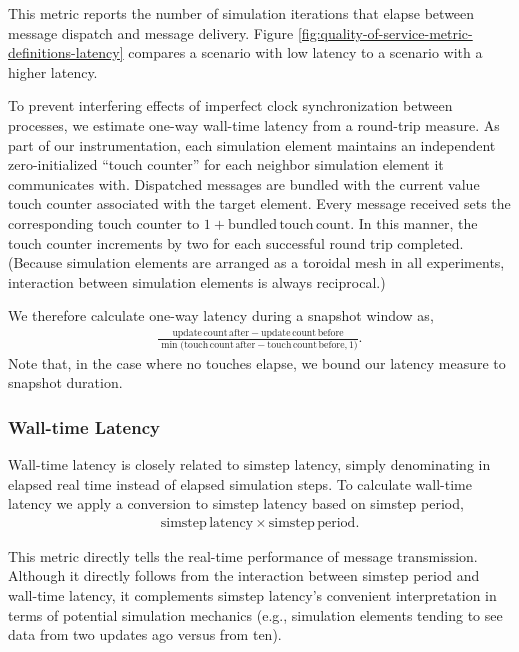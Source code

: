 This metric reports the number of simulation iterations that elapse between message dispatch and message delivery.
Figure \ref{fig:quality-of-service-metric-definitions-latency} compares a scenario with low latency to a scenario with a higher latency.

To prevent interfering effects of imperfect clock synchronization between processes, we estimate one-way wall-time latency from a round-trip measure.
As part of our instrumentation, each simulation element maintains an independent zero-initialized ``touch counter'' for each neighbor simulation element it communicates with.
Dispatched messages are bundled with the current value touch counter associated with the target element.
Every message received sets the corresponding touch counter to $1 + \mathrm{bundled\,touch\,count}$.
In this manner, the touch counter increments by two for each successful round trip completed.
(Because simulation elements are arranged as a toroidal mesh in all experiments, interaction between simulation elements is always reciprocal.)

We therefore calculate one-way latency during a snapshot window as,
\begin{align*}
  \frac{
    \mathrm{update\,count\,after} - \mathrm{update\,count\,before}
  }{
    \min\Big( \mathrm{ touch\,count\,after } - \mathrm{ touch\,count\,before }, 1 \Big)
  }.
\end{align*}
Note that, in the case where no touches elapse, we bound our latency measure to snapshot duration.


\subsubsection{Wall-time Latency} \label{sec:simulation-time-latency-metric}

Wall-time latency is closely related to simstep latency, simply denominating in elapsed real time instead of elapsed simulation steps.
To calculate wall-time latency we apply a conversion to simstep latency based on simstep period,
\begin{align*}
  \mathrm{simstep\,latency} \times \mathrm{simstep\,period}.
\end{align*}

This metric directly tells the real-time performance of message transmission.
Although it directly follows from the interaction between simstep period and wall-time latency, it complements simstep latency's convenient interpretation in terms of potential simulation mechanics (e.g., simulation elements tending to see data from two updates ago versus from ten).

